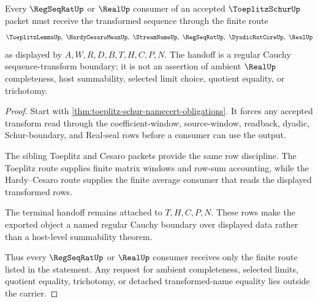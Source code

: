 \begin{theorem}
\label{thm:toeplitz-schur-regular-cauchy-handoff}
Every $\RegSeqRatUp$ or $\RealUp$ consumer of an accepted $\ToeplitzSchurUp$ packet must receive the transformed sequence through the finite route
$$
\ToeplitzLemmaUp,\ \HardyCesaroMeanUp,\ \StreamNameUp,\ \RegSeqRatUp,\ \DyadicRatCoreUp,\ \RealUp
$$
as displayed by $A,W,R,D,B,T,H,C,P,N$. The handoff is a regular Cauchy sequence-transform boundary; it is not an assertion of ambient $\RealUp$ completeness, host summability, selected limit choice, quotient equality, or trichotomy.
\end{theorem}
\begin{proof}
Start with \autoref{thm:toeplitz-schur-namecert-obligations}. It forces any accepted transform read through the coefficient-window, source-window, readback, dyadic, Schur-boundary, and Real-seal rows before a consumer can use the output.

The sibling Toeplitz and Cesaro packets provide the same row discipline. The Toeplitz route supplies finite matrix windows and row-sum accounting, while the Hardy--Cesaro route supplies the finite average consumer that reads the displayed transformed rows.

The terminal handoff remains attached to $T,H,C,P,N$. These rows make the exported object a named regular Cauchy boundary over displayed data rather than a host-level summability theorem.

Thus every $\RegSeqRatUp$ or $\RealUp$ consumer receives only the finite route listed in the statement. Any request for ambient completeness, selected limits, quotient equality, trichotomy, or detached transformed-name equality lies outside the carrier.
\end{proof}



